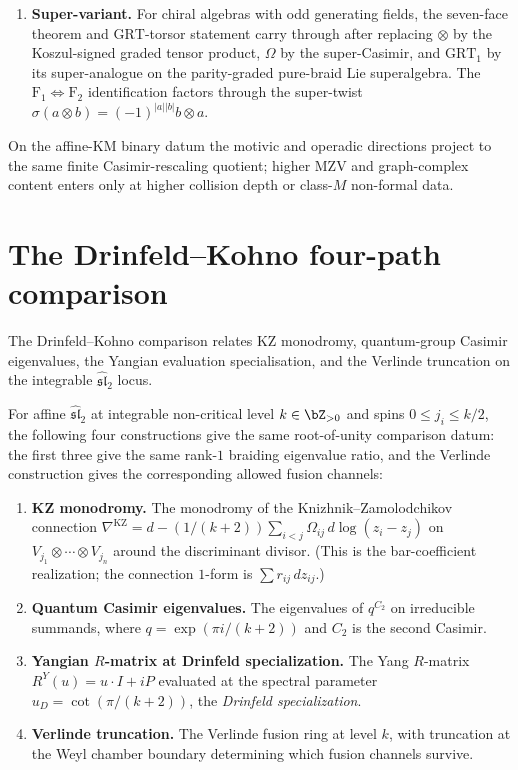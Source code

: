 \begin{remark}
\begin{enumerate}[label=\textup{(\roman*)}]
\item \textbf{Super-variant.} For chiral algebras with odd
generating fields, the seven-face theorem and
$\mathrm{GRT}$-torsor statement carry through after replacing
$\otimes$ by the Koszul-signed graded tensor product, $\Omega$ by
the super-Casimir, and $\mathrm{GRT}_1$ by its super-analogue on
the parity-graded pure-braid Lie superalgebra. The
$\mathrm{F}_1\Leftrightarrow\mathrm{F}_2$ identification factors
through the super-twist
$\sigma(a\otimes b) = (-1)^{|a||b|}b\otimes a$.
\end{enumerate}

On the affine-KM binary datum the motivic and operadic directions
project to the same finite Casimir-rescaling quotient; higher MZV
and graph-complex content enters only at higher collision depth or
class-$M$ non-formal data.
\end{remark}

\section{The Drinfeld--Kohno four-path comparison}
\label{sec:dnp-master-dk-four-path}

The Drinfeld--Kohno comparison relates KZ monodromy,
quantum-group Casimir eigenvalues, the Yangian evaluation
specialisation, and the Verlinde truncation on the integrable
$\widehat{\mathfrak{sl}}_2$ locus.

\begin{theorem}
\label{thm:dk-four-path}
For affine $\widehat{\mathfrak{sl}}_2$ at integrable non-critical level
$k\in\bZ_{>0}$ and spins $0\leq j_i\leq k/2$, the following four
constructions give the same root-of-unity comparison datum: the first
three give the same rank-$1$ braiding eigenvalue ratio, and the
Verlinde construction gives the corresponding allowed fusion channels:
\begin{enumerate}[label=\textup{(\arabic*)}]
\item \textbf{KZ monodromy.} The monodromy of the Knizhnik--Zamolodchikov
 connection $\nabla^{\mathrm{KZ}} = d - (1/(k+2))\sum_{i<j}\Omega_{ij}\,d\log(z_i-z_j)$
 on $V_{j_1}\otimes\cdots\otimes V_{j_n}$ around the discriminant
 divisor. (This is the bar-coefficient realization; the connection
 $1$-form is $\sum r_{ij}\,dz_{ij}$.)
\item \textbf{Quantum Casimir eigenvalues.} The eigenvalues of
 $q^{C_2}$ on irreducible summands, where
 $q = \exp(\pi i/(k+2))$ and $C_2$ is the second Casimir.
\item \textbf{Yangian $R$-matrix at Drinfeld specialization.} The
 Yang $R$-matrix $R^Y(u) = u\cdot I + i P$ evaluated at the spectral
 parameter $u_D = \cot(\pi/(k+2))$, the \emph{Drinfeld
 specialization}.
\item \textbf{Verlinde truncation.} The Verlinde fusion ring at
 level $k$, with truncation at the Weyl chamber boundary determining
 which fusion channels survive.
\end{enumerate}
\end{theorem}

